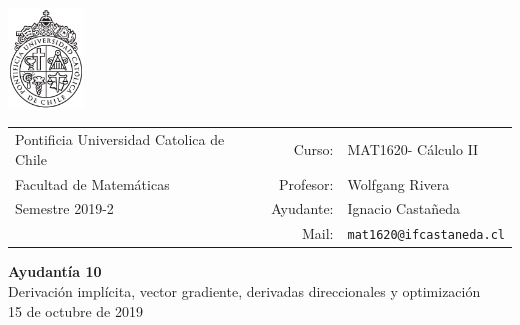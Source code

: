 \documentclass[12pt]{article}
\makeatletter
\newcommand{\ayudantia}{{\sc Ayudantía 10}}
\newcommand{\tituloayu}{Derivación implícita, vector gradiente, derivadas direccionales y optimización}
\newcommand{\fecha}{15 de octubre de 2019}
\newcommand{\sigla}{MAT1620}
\newcommand{\nombre}{Cálculo II}
\newcommand{\profesor}{Wolfgang Rivera}
\newcommand{\ano}{2019}
\newcommand{\semestre}{2}
\newcommand{\mail}{mat1620@ifcastaneda.cl}
\makeatother
\begin{document}
\thispagestyle{empty}

\begin{minipage}{2cm}
	\includegraphics[width=2cm]{../../../../img/logo.pdf}
	\vspace{0.5cm}
\end{minipage}
\begin{minipage}{\linewidth}
	\begin{tabular}{lrl}
		{\scriptsize\sc Pontificia Universidad Catolica de Chile} & \hspace*{0.7in}Curso: &
		\sigla  - \nombre\\
		{\sc Facultad de Matemáticas}&
		Profesor: & \profesor \\
		{\sc Semestre \ano-\semestre} & Ayudante: & {Ignacio Castañeda}\\
		& {Mail:} & \texttt{\mail}
	\end{tabular}
\end{minipage}

\vspace{-10mm}
\begin{center}
	{\LARGE\bf \ayudantia}\\
	\vspace{0.1cm}
	{\tituloayu}\\
	\vspace{0.1cm}
	\fecha\\
	\vspace{0.4cm}
\end{center}
\end{document}
